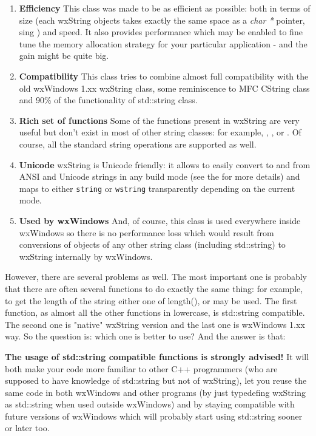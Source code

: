 \begin{enumerate}\itemsep=0pt
\item {\bf Efficiency} This class was made to be as efficient as possible: both
in terms of size (each wxString objects takes exactly the same space as a {\it
char *} pointer, sing ) and speed.
It also provides performance  
which may be enabled to fine tune the memory allocation strategy for your
particular application - and the gain might be quite big.
\item {\bf Compatibility} This class tries to combine almost full compatibility
with the old wxWindows 1.xx wxString class, some reminiscence to MFC CString
class and 90\% of the functionality of std::string class.
\item {\bf Rich set of functions} Some of the functions present in wxString are
very useful but don't exist in most of other string classes: for example, 
, 
,  
or . Of course, all the standard string
operations are supported as well.
\item {\bf Unicode} wxString is Unicode friendly: it allows to easily convert
to and from ANSI and Unicode strings in any build mode (see the 
 for more details) and maps to either
{\tt string} or {\tt wstring} transparently depending on the current mode.
\item {\bf Used by wxWindows} And, of course, this class is used everywhere
inside wxWindows so there is no performance loss which would result from
conversions of objects of any other string class (including std::string) to
wxString internally by wxWindows.
\end{enumerate}

However, there are several problems as well. The most important one is probably
that there are often several functions to do exactly the same thing: for
example, to get the length of the string either one of 
length(),  or 
 may be used. The first function, as almost
all the other functions in lowercase, is std::string compatible. The second one
is "native" wxString version and the last one is wxWindows 1.xx way. So the
question is: which one is better to use? And the answer is that:

{\bf The usage of std::string compatible functions is strongly advised!} It will
both make your code more familiar to other C++ programmers (who are supposed to
have knowledge of std::string but not of wxString), let you reuse the same code
in both wxWindows and other programs (by just typedefing wxString as std::string
when used outside wxWindows) and by staying compatible with future versions of
wxWindows which will probably start using std::string sooner or later too.

